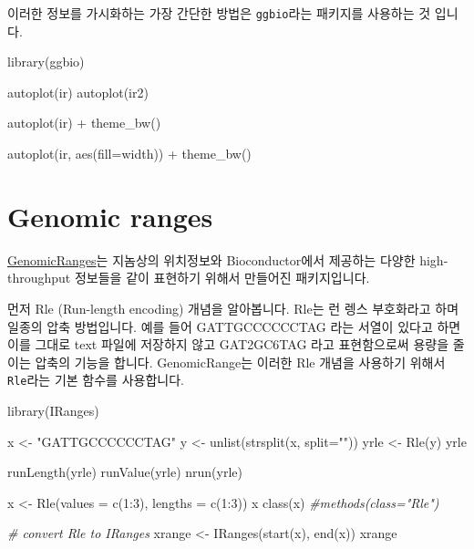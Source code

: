 \documentclass[
]{book}
\newenvironment{Shaded}{\begin{snugshade}}{\end{snugshade}}
\newcommand{\AttributeTok}[1]{\textcolor[rgb]{0.77,0.63,0.00}{#1}}
\newcommand{\CommentTok}[1]{\textcolor[rgb]{0.56,0.35,0.01}{\textit{#1}}}
\newcommand{\DecValTok}[1]{\textcolor[rgb]{0.00,0.00,0.81}{#1}}
\newcommand{\FunctionTok}[1]{\textcolor[rgb]{0.00,0.00,0.00}{#1}}
\newcommand{\NormalTok}[1]{#1}
\newcommand{\OtherTok}[1]{\textcolor[rgb]{0.56,0.35,0.01}{#1}}
\newcommand{\SpecialCharTok}[1]{\textcolor[rgb]{0.00,0.00,0.00}{#1}}
\newcommand{\StringTok}[1]{\textcolor[rgb]{0.31,0.60,0.02}{#1}}
\begin{document}
이러한 정보를 가시화하는 가장 간단한 방법은 \texttt{ggbio}라는 패키지를 사용하는 것 입니다.

\begin{Shaded}
\begin{Highlighting}[]
\FunctionTok{library}\NormalTok{(ggbio)}

\FunctionTok{autoplot}\NormalTok{(ir) }
\FunctionTok{autoplot}\NormalTok{(ir2) }

\FunctionTok{autoplot}\NormalTok{(ir) }\SpecialCharTok{+} 
  \FunctionTok{theme\_bw}\NormalTok{()}

\FunctionTok{autoplot}\NormalTok{(ir, }\FunctionTok{aes}\NormalTok{(}\AttributeTok{fill=}\NormalTok{width)) }\SpecialCharTok{+}
  \FunctionTok{theme\_bw}\NormalTok{()}
\end{Highlighting}
\end{Shaded}

\hypertarget{genomic-ranges}{%
\section{Genomic ranges}\label{genomic-ranges}}

\href{https://bioconductor.org/packages/release/bioc/html/GenomicRanges.html}{GenomicRanges}는 지놈상의 위치정보와 Bioconductor에서 제공하는 다양한 high-throughput 정보들을 같이 표현하기 위해서 만들어진 패키지입니다.

먼저 Rle (Run-length encoding) 개념을 알아봅니다. Rle는 런 렝스 부호화라고 하며 일종의 압축 방법입니다. 예를 들어 GATTGCCCCCCTAG 라는 서열이 있다고 하면 이를 그대로 text 파일에 저장하지 않고 GAT2GC6TAG 라고 표현함으로써 용량을 줄이는 압축의 기능을 합니다. GenomicRange는 이러한 Rle 개념을 사용하기 위해서 \texttt{Rle}라는 기본 함수를 사용합니다.

\begin{Shaded}
\begin{Highlighting}[]
\FunctionTok{library}\NormalTok{(IRanges)}

\NormalTok{x }\OtherTok{\textless{}{-}} \StringTok{"GATTGCCCCCCTAG"}
\NormalTok{y }\OtherTok{\textless{}{-}} \FunctionTok{unlist}\NormalTok{(}\FunctionTok{strsplit}\NormalTok{(x, }\AttributeTok{split=}\StringTok{""}\NormalTok{))}
\NormalTok{yrle }\OtherTok{\textless{}{-}} \FunctionTok{Rle}\NormalTok{(y)}
\NormalTok{yrle}

\FunctionTok{runLength}\NormalTok{(yrle)}
\FunctionTok{runValue}\NormalTok{(yrle)}
\FunctionTok{nrun}\NormalTok{(yrle)}

\NormalTok{x }\OtherTok{\textless{}{-}} \FunctionTok{Rle}\NormalTok{(}\AttributeTok{values =} \FunctionTok{c}\NormalTok{(}\DecValTok{1}\SpecialCharTok{:}\DecValTok{3}\NormalTok{), }\AttributeTok{lengths =} \FunctionTok{c}\NormalTok{(}\DecValTok{1}\SpecialCharTok{:}\DecValTok{3}\NormalTok{))}
\NormalTok{x}
\FunctionTok{class}\NormalTok{(x)}
\CommentTok{\#methods(class="Rle")}

\CommentTok{\# convert Rle to IRanges}
\NormalTok{xrange }\OtherTok{\textless{}{-}} \FunctionTok{IRanges}\NormalTok{(}\FunctionTok{start}\NormalTok{(x), }\FunctionTok{end}\NormalTok{(x))}
\NormalTok{xrange}
\end{Highlighting}
\end{Shaded}
\end{document}
